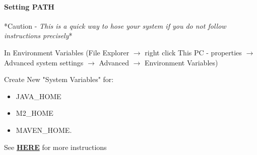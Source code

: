 \documentclass[12pt]{article}
\begin{document}
\paragraph{Setting PATH} \mbox{} 

*Caution - \textit{This is a quick way to hose your system if you do not follow instructions precisely}*

In Environment Variables (File Explorer $\rightarrow$ right click This PC - properties $\rightarrow$ Advanced system settings $\rightarrow$ Advanced $\rightarrow$ Environment Variables)

Create New "System Variables" for:
\begin{itemize}
\item JAVA\_HOME
\item M2\_HOME
\item MAVEN\_HOME. 
\end{itemize}
See \textbf{\href{https://www.mkyong.com/maven/how-to-install-maven-in-windows/}{HERE}} for more instructions
\end{document}
